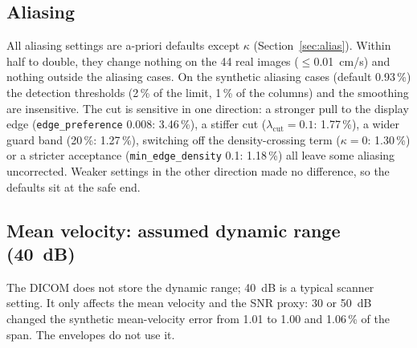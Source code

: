 \documentclass[11pt,a4paper]{article}
\newcommand{\code}[1]{\texttt{\small #1}}
\begin{document}
\subsection{Aliasing}
All aliasing settings are a-priori defaults except $\kappa$ (Section~\ref{sec:alias}). Within half to double, they change
nothing on the 44 real images ($\le$0.01~cm/s) and nothing outside the aliasing cases. On the synthetic aliasing cases
(default 0.93\,\%) the detection thresholds (2\,\% of the limit, 1\,\% of the columns) and the smoothing are
insensitive. The cut is sensitive in one direction: a stronger pull to the display edge (\code{edge\_preference} 0.008:
3.46\,\%), a stiffer cut ($\lambda_{\mathrm{cut}} = 0.1$: 1.77\,\%), a wider guard band (20\,\%: 1.27\,\%), switching off the
density-crossing term ($\kappa = 0$: 1.30\,\%) or a stricter acceptance (\code{min\_edge\_density} 0.1: 1.18\,\%) all
leave some aliasing uncorrected. Weaker settings in the other direction made no difference, so the defaults sit at
the safe end.

\subsection{Mean velocity: assumed dynamic range (40~dB)}
The DICOM does not store the dynamic range; 40~dB is a typical scanner setting. It only affects the mean velocity and
the SNR proxy: 30 or 50~dB changed the synthetic mean-velocity error from 1.01 to 1.00 and 1.06\,\% of the span. The
envelopes do not use it.
\end{document}
